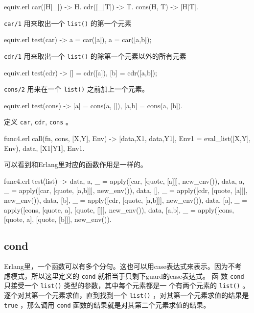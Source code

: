 \documentclass[preview,multi,crop=false,border=1in,class=memoir]{standalone}
\begin{document}
\begin{preview-page}
\begin{SourceCode}[9][11]{equiv.erl}
car([H|_]) -> H.
cdr([_|T]) -> T.
cons(H, T) -> [H|T].
\end{SourceCode}

\verb|car/1| 用来取出一个 \verb|list()| 的第一个元素

\begin{SourceCode}[17][19]{equiv.erl}
test(car) ->
    a = car([a]),
    a = car([a,b]);
\end{SourceCode}

\verb|cdr/1| 用来取出一个 \verb|list()| 的除第一个元素以外的所有元素

\begin{SourceCode}[20][22]{equiv.erl}
test(cdr) ->
    [] = cdr([a]),
    [b] = cdr([a,b]);
\end{SourceCode}

\verb|cons/2| 用来在一个 \verb|list()| 之前加上一个元素。

\begin{SourceCode}[23][25]{equiv.erl}
test(cons) ->
    [a] = cons(a, []),
    [a,b] = cons(a, [b]).
\end{SourceCode}

定义 \verb|car|, \verb|cdr|, \verb|cons| 。

\begin{SourceCode}[35][38]{func4.erl}
call({fn, cons}, [X,Y], Env) ->
    {[{data,X1}, {data,Y1}], Env1} =
        eval_list([X,Y], Env),
    {{data, [X1|Y1]}, Env1}.
\end{SourceCode}

可以看到和Erlang里对应的函数作用是一样的。

\begin{SourceCode}[82][96]{func4.erl}
test(list) ->
    {{data, a}, _} =
        apply([car, [quote, [a]]], new_env()),
    {{data, a}, _} =
        apply([car, [quote, [a,b]]], new_env()),
    {{data, []}, _} =
        apply([cdr, [quote, [a]]], new_env()),
    {{data, [b]}, _} =
        apply([cdr, [quote, [a,b]]], new_env()),
    {{data, [a]}, _} =
        apply([cons, [quote, a], [quote, []]],
              new_env()),
    {{data, [a,b]}, _} =
        apply([cons, [quote, a], [quote, [b]]],
              new_env()).
\end{SourceCode}

\subsection{cond}

Erlang里，一个函数可以有多个分句。这也可以用case表达式来表示。因为不考
虑模式，所以这里定义的 \verb|cond| 就相当于只剩下guard的case表达式。 函
数 \verb|cond| 只接受一个 \verb|list()| 类型的参数，其中每个元素都是一
个有两个元素的 \verb|list()| 。逐个对其第一个元素求值，直到找到一个
\verb|list()| ，对其第一个元素求值的结果是 \verb|true| ，那么调用
\verb|cond| 函数的结果就是对其第二个元素求值的结果。


\end{preview-page}
\end{document}
